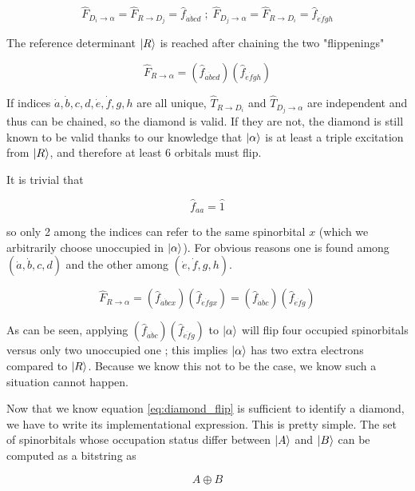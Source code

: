 \documentclass[./thesis.tex]{subfiles}
\begin{document}
\begin{equation}
\hat F_{D_i \rightarrow \alpha} = \hat F_{R \rightarrow D_j} = \hat f_{\dot a \dot bcd} \; ; \; \hat F_{D_j \rightarrow \alpha} = \hat F_{R \rightarrow D_i} = \hat f_{\dot e \dot fgh}
\end{equation}

The reference determinant $\ket R$ is reached after chaining the two "flippenings"

\begin{equation}
\hat F_{R \rightarrow \alpha} = (\hat f_{\dot a \dot bcd})(\hat f_{\dot e \dot fgh})
\end{equation}

If indices $\dot a,\dot b,c,d,\dot e,\dot f,g,h$ are all unique, $\hat T_{R \rightarrow D_i}$ and $\hat T_{D_j \rightarrow \alpha}$ are independent and thus can be chained, so the diamond is valid. If they are not, the diamond is still known to be valid thanks to our knowledge that ${\ket{\alpha}}$ is at least a triple excitation from $\ket R$, and therefore at least 6 orbitals must flip. 

It is trivial that

\begin{equation}
\hat f_{aa} = \hat 1
\end{equation}

so only 2 among the indices can refer to the same spinorbital $x$ (which we arbitrarily choose unoccupied in ${\ket{\alpha}}$). For obvious reasons one is found among $(\dot a,\dot b,c,d)$ and the other among $(\dot e,\dot f,g,h)$.

\begin{equation}
\hat F_{R \rightarrow \alpha} = (\hat f_{\dot a \dot bcx})(\hat f_{\dot e \dot fgx}) = (\hat f_{\dot a \dot bc})(\hat f_{\dot e \dot fg})
\end{equation}

As can be seen, applying $(\hat f_{\dot a \dot bc})(\hat f_{\dot e \dot fg})$ to ${\ket{\alpha}}$ will flip four occupied spinorbitals versus only two unoccupied one ; this implies ${\ket{\alpha}}$ has two extra electrons compared to $\ket R$. Because we know this not to be the case, we know such a situation cannot happen.

Now that we know equation \ref{eq:diamond_flip} is sufficient to identify a diamond, we have to write its implementational expression. This is pretty simple. The set of spinorbitals whose occupation status differ between $\ket A$ and $\ket B$ can be computed as a bitstring as

\begin{equation}
A \oplus B
\end{equation}
\end{document}
